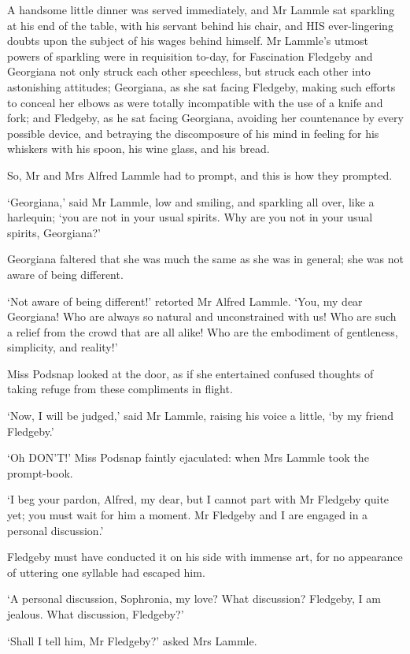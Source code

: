 A handsome little dinner was served immediately, and Mr Lammle sat
sparkling at his end of the table, with his servant behind his chair,
and HIS ever-lingering doubts upon the subject of his wages behind
himself. Mr Lammle’s utmost powers of sparkling were in requisition
to-day, for Fascination Fledgeby and Georgiana not only struck each
other speechless, but struck each other into astonishing attitudes;
Georgiana, as she sat facing Fledgeby, making such efforts to conceal
her elbows as were totally incompatible with the use of a knife and
fork; and Fledgeby, as he sat facing Georgiana, avoiding her countenance
by every possible device, and betraying the discomposure of his mind in
feeling for his whiskers with his spoon, his wine glass, and his bread.

So, Mr and Mrs Alfred Lammle had to prompt, and this is how they
prompted.

‘Georgiana,’ said Mr Lammle, low and smiling, and sparkling all over,
like a harlequin; ‘you are not in your usual spirits. Why are you not in
your usual spirits, Georgiana?’

Georgiana faltered that she was much the same as she was in general; she
was not aware of being different.

‘Not aware of being different!’ retorted Mr Alfred Lammle. ‘You, my dear
Georgiana! Who are always so natural and unconstrained with us! Who are
such a relief from the crowd that are all alike! Who are the embodiment
of gentleness, simplicity, and reality!’

Miss Podsnap looked at the door, as if she entertained confused thoughts
of taking refuge from these compliments in flight.

‘Now, I will be judged,’ said Mr Lammle, raising his voice a little, ‘by
my friend Fledgeby.’

‘Oh DON’T!’ Miss Podsnap faintly ejaculated: when Mrs Lammle took the
prompt-book.

‘I beg your pardon, Alfred, my dear, but I cannot part with Mr Fledgeby
quite yet; you must wait for him a moment. Mr Fledgeby and I are engaged
in a personal discussion.’

Fledgeby must have conducted it on his side with immense art, for no
appearance of uttering one syllable had escaped him.

‘A personal discussion, Sophronia, my love? What discussion? Fledgeby, I
am jealous. What discussion, Fledgeby?’

‘Shall I tell him, Mr Fledgeby?’ asked Mrs Lammle.

